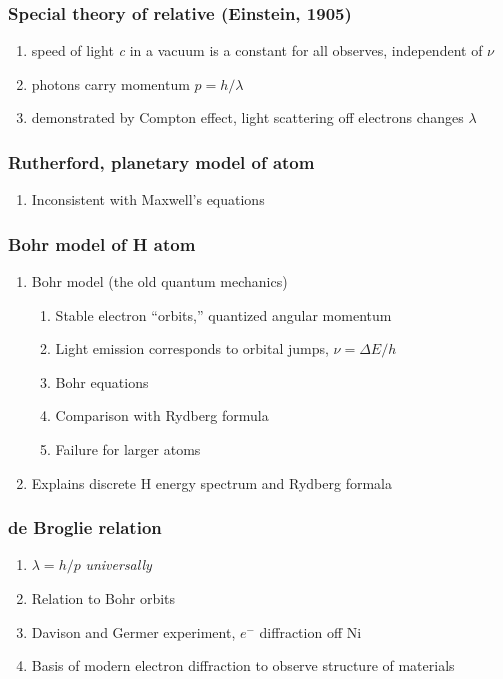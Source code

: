 \documentclass[11pt]{article}
\begin{document}
\subsubsection{Special theory of relative (Einstein, 1905)}
\label{sec:org1761e61}
\begin{enumerate}
\item speed of light \emph{c} in a vacuum is a constant for all observes, independent of \(\nu\)
\item photons carry momentum  \(p=h/\lambda\)
\item demonstrated by Compton effect, light scattering off electrons changes \(\lambda\)
\end{enumerate}
\subsubsection{Rutherford, planetary model of atom}
\label{sec:org4865298}
\begin{enumerate}
\item Inconsistent with Maxwell's equations
\end{enumerate}
\subsubsection{Bohr model of H atom}
\label{sec:org5fb5f92}
\begin{enumerate}
\item Bohr model (the old quantum mechanics)
\begin{enumerate}
\item Stable electron ``orbits,'' quantized angular momentum
\item Light emission corresponds to orbital jumps, \(\nu=\Delta E/h\)
\item Bohr equations
\item Comparison with Rydberg formula
\item Failure for larger atoms
\end{enumerate}
\item Explains discrete H energy spectrum and Rydberg formala
\end{enumerate}
\subsubsection{de Broglie relation}
\label{sec:orgea4027b}
\begin{enumerate}
\item \(\lambda=h/p\) \emph{universally}
\item Relation to Bohr orbits
\item Davison and Germer experiment, \(e^-\) diffraction off Ni
\item Basis of modern electron diffraction to observe structure of materials
\end{enumerate}
\end{document}
